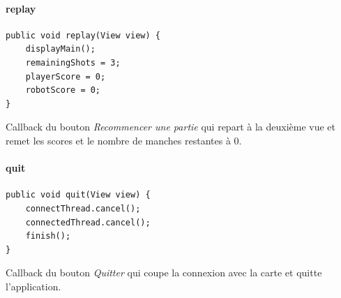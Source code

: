 \paragraph{replay}

\begin{lstlisting}
public void replay(View view) {
	displayMain();
	remainingShots = 3;
	playerScore = 0;
	robotScore = 0;
}
\end{lstlisting}
Callback du bouton \emph{Recommencer une partie} qui repart à la deuxième vue et remet les scores et le nombre de manches restantes à 0.

\paragraph{quit}

\begin{lstlisting}
public void quit(View view) {
	connectThread.cancel();
	connectedThread.cancel();
	finish();
}
\end{lstlisting}
Callback du bouton \emph{Quitter} qui coupe la connexion avec la carte et quitte l'application.

